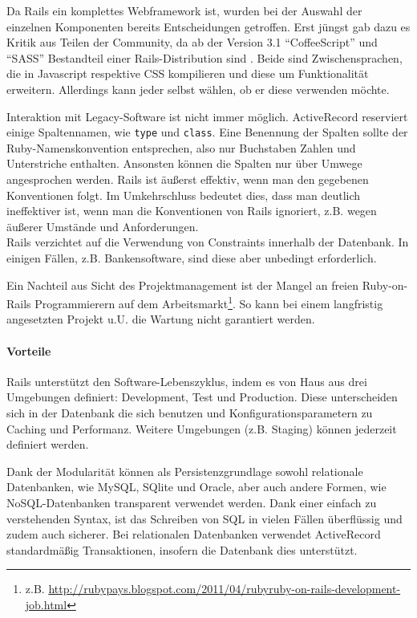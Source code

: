  Da Rails ein komplettes Webframework ist, wurden bei der Auswahl der einzelnen Komponenten bereits Entscheidungen getroffen.  Erst jüngst gab dazu es Kritik aus Teilen der Community, da ab der Version 3.1 "`CoffeeScript"' und "`SASS"' Bestandteil einer Rails-Distribution sind \citep{peter_cooper_rails_2011}. Beide sind Zwischensprachen, die in Javascript respektive CSS kompilieren und diese um Funktionalität erweitern. Allerdings kann jeder selbst wählen, ob er diese verwenden möchte.


Interaktion mit Legacy-Software ist nicht immer möglich. ActiveRecord reserviert einige Spaltennamen, wie \texttt{type} und \texttt{class}. Eine Benennung der Spalten sollte der Ruby-Namenskonvention entsprechen, also nur Buchstaben Zahlen und Unterstriche enthalten. Ansonsten können die Spalten nur über Umwege angesprochen werden. Rails ist äußerst effektiv, wenn man den gegebenen Konventionen folgt. Im Umkehrschluss bedeutet dies, dass man deutlich ineffektiver ist, wenn man die Konventionen von Rails ignoriert, z.B. wegen äußerer Umstände und Anforderungen.\\
Rails verzichtet auf die Verwendung von Constraints innerhalb der Datenbank. In einigen Fällen, z.B. Bankensoftware, sind diese aber unbedingt erforderlich.

Ein Nachteil aus Sicht des Projektmanagement ist der Mangel an freien Ruby-on-Rails Programmierern auf dem Arbeitsmarkt\footnote{z.B. \url{http://rubypays.blogspot.com/2011/04/rubyruby-on-rails-development-job.html}}. So kann bei einem langfristig angesetzten Projekt u.U. die Wartung nicht garantiert werden.

\paragraph{Vorteile}
Rails unterstützt den Software-Lebenszyklus, indem es von Haus aus drei Umgebungen definiert: Development, Test und Production. Diese unterscheiden sich in der Datenbank die sich benutzen und Konfigurationsparametern zu Caching und Performanz. Weitere Umgebungen (z.B. Staging) können jederzeit definiert werden.


Dank der Modularität können als Persistenzgrundlage sowohl relationale Datenbanken, wie MySQL, SQlite und Oracle, aber auch andere Formen, wie NoSQL-Datenbanken transparent verwendet werden. Dank einer einfach zu verstehenden Syntax, ist das Schreiben von SQL in vielen Fällen überflüssig und zudem auch sicherer. Bei relationalen Datenbanken verwendet ActiveRecord standardmäßig Transaktionen, insofern die Datenbank dies unterstützt.



